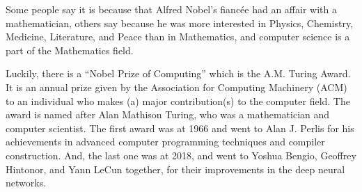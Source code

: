 
Some people say it is because that Alfred Nobel's fiancée had an affair with a mathematician, others say because he was more interested in Physics, Chemistry, Medicine, Literature, and Peace than in Mathematics, and computer science is a part of the Mathematics field.

Luckily, there is a ``Nobel Prize of Computing'' which is the A.M. Turing Award. It is an annual prize given by the Association for Computing Machinery (ACM) to an individual who makes (a) major contribution(s) to the computer field. The award is named after Alan Mathison Turing, who was a mathematician and computer scientist. The first award was at 1966 and went to Alan J. Perlis for his achievements in advanced computer programming techniques and compiler construction. And, the last one was at 2018, and went to Yoshua Bengio, Geoffrey Hintonor, and Yann LeCun together, for their improvements in the deep neural networks.


